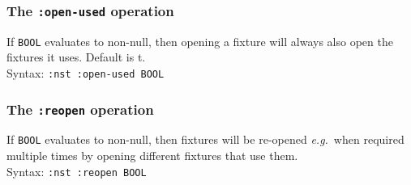 \subsubsection{The \texttt{:open-used} operation}
%
If \texttt{BOOL} evaluates to non-null, then opening a fixture will
always also open the fixtures it uses.  Default is t.
\\ Syntax: \texttt{:nst :open-used BOOL}

\subsubsection{The \texttt{:reopen} operation}
%
If \texttt{BOOL} evaluates to non-null, then fixtures will be
re-opened \emph{e.g.}\ when required multiple times by opening
different fixtures that use them.
\\ Syntax: \texttt{:nst :reopen BOOL}

